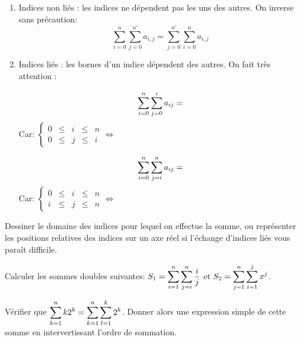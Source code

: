 \documentclass[a4paper, 11pt,reqno]{article}
\begin{document}
\begin{enumerate}
\item Indices non li\'es : les indices ne d\'ependent pas les uns des autres.
On inverse sans pr\'ecaution:\\
$$\sum_{i=0}^n \sum_{j=0}^{n'}  a_{i,j} = \sum_{j=0}^{n'} \sum_{i=0}^n  a_{i,j} $$


\item Indices li\'es : les bornes d'un indice d\'ependent des autres. On fait très attention : 

$$\displaystyle \sum\limits_{i=0}^n\sum\limits_{j=0}^i a_{ij}= $$
Car: $\left\lbrace \begin{array}{lllll} 0&\leq &i & \leq & n\\  0&\leq &j & \leq & i \end{array}\right. \Longleftrightarrow $


$$\displaystyle \sum\limits_{i=0}^n\sum\limits_{j=i}^n a_{ij}=$$
Car: $\left\lbrace \begin{array}{lllll} 0&\leq &i & \leq & n\\  i&\leq &j & \leq & n \end{array}\right. \Longleftrightarrow$


\end{enumerate}






\begin{rem}
Dessiner le domaine des indices pour lequel on effectue la somme, ou repr\'esenter les positions relatives des indices sur un axe r\'eel si l'\'echange d'indices li\'es vous para\^it difficile.
\end{rem}



\begin{exemples}
Calculer les sommes doubles suivantes: $S_1= \displaystyle \sum\limits_{i=1}^n\sum\limits_{j=i}^n \displaystyle\frac{i}{j}$ et $S_2= \displaystyle \sum\limits_{j=1}^n\sum\limits_{i=1}^j x^{j}$.
\end{exemples}

{\footnotesize 
\begin{exercice} 
V\'erifier que $\displaystyle \sum\limits_{k=1}^n k2^k=\sum\limits_{k=1}^n \sum\limits_{l=1}^k 2^k$. Donner alors une expression simple de cette somme en intervertissant l'ordre de sommation.
\end{exercice}}
\end{document}
